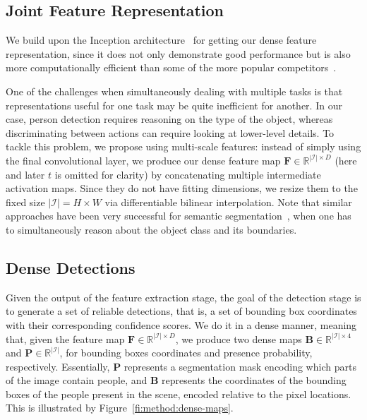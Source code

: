 \documentclass[10pt,twocolumn,letterpaper]{article}
\newcommand{\bF}[0]{\mathbf{F}}
\newcommand{\bP}[0]{\mathbf{P}}
\newcommand{\bB}[0]{\mathbf{B}}
\newcommand{\mR}[0]{\mathbb{R}}
\newcommand{\mI}[0]{\mathcal{I}}
\begin{document}
\subsection{Joint Feature Representation}
We build upon the Inception architecture~\cite{Szegedy2015} for getting our
dense feature representation, since it does not only demonstrate good performance
but is also more computationally efficient than some of the more popular
competitors~\cite{Simonyan2014, Krizhevsky2012}. 

One of the challenges when simultaneously dealing with multiple tasks
is that representations useful for one task may be quite inefficient for another. 
In our case, person detection requires
reasoning on the type of the object, whereas discriminating between actions can
require looking at lower-level details. To tackle this problem, we propose
using multi-scale features: instead of simply using the final convolutional
layer, we produce our dense feature map $\bF \in \mR^{|\mI|\times D}$ (here and later
$t$ is omitted for clarity) by concatenating multiple intermediate activation
maps. Since they do not have fitting dimensions, we resize them to the fixed
size $|\mI| = H \times W$ via differentiable bilinear interpolation. 
Note that similar approaches have been very successful for semantic
segmentation~\cite{Long2015,   Hariharan2015}, when one has to simultaneously
reason about the object class and its boundaries.



\subsection{Dense Detections}
\vspace{-0.15cm}

Given the output of the feature extraction stage, the goal of the detection
stage is to generate a set of reliable detections, that is, a set of
bounding box coordinates with their corresponding confidence scores. We do it in
a dense manner, meaning that, given the feature map $\bF \in \mR^{|\mI|\times D}$,
we produce two dense maps $\bB \in \mR^{|\mI|\times 4}$ and $\bP \in \mR^{|\mI|}$,
for bounding boxes coordinates and presence probability,
respectively. Essentially, $\bP$ represents a segmentation mask encoding
which parts of the image contain people, and $\bB$
represents the coordinates of the bounding boxes of the people present in the
scene, encoded relative to the pixel locations. This is illustrated by
Figure~\ref{fi:method:dense-maps}. 
\end{document}
